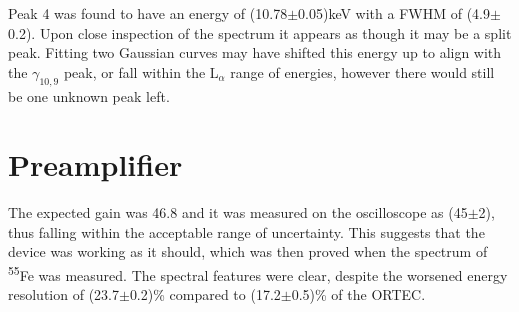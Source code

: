 Peak 4 was found to have an energy of (10.78$\pm$0.05)keV with a FWHM of (4.9$\pm$0.2). Upon close inspection of the spectrum it appears as though it may be a split peak. Fitting two Gaussian curves may have shifted this energy up to align with the $\gamma_{10,9}$ peak, or fall within the L$_{\alpha}$ range of energies, however there would still be one unknown peak left.

\section{Preamplifier}

The expected gain was 46.8 and it was measured on the oscilloscope as (45$\pm$2), thus falling within the acceptable range of uncertainty. This suggests that the device was working as it should, which was then proved when the spectrum of \textsuperscript{55}Fe was measured. The spectral features were clear, despite the worsened energy resolution of (23.7$\pm$0.2)\% compared to (17.2$\pm$0.5)\% of the ORTEC.